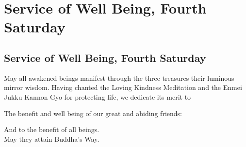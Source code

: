 \documentclass{chantbook}
\begin{document}
\part{Service of Well Being, Fourth Saturday}
\chapter{Service of Well Being, Fourth Saturday}
\begin{service}
\kokyo \makaHannyaHaramittaShingyo
\kokyo \shosaimyoKichijoDharani
\kokyo {}
\kokyo \lovingKindnessMeditation
\kokyo \enmeiJukkuKannonGyo
\kokyo May all awakened beings manifest through the three treasures their
luminous mirror wisdom. Having chanted the Loving Kindness Meditation and the
Enmei Jukku Kannon Gyo for protecting life, we dedicate its merit to

The benefit and well being of our great and abiding friends: \hrulefill

And to the benefit of all beings.\\
May they attain Buddha's Way. \largebell
\end{service}
\end{document}
